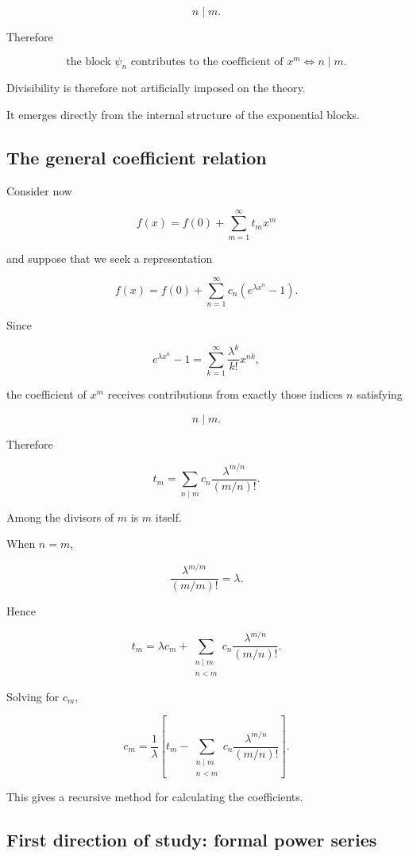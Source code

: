 \[
n\mid m.
\]

Therefore

\[
\boxed{
\text{the block }\psi_n
\text{ contributes to the coefficient of }x^m
\Longleftrightarrow
n\mid m.
}
\]

Divisibility is therefore not artificially imposed on the theory.

It emerges directly from the internal structure of the exponential blocks.

\subsection{The general coefficient relation}

Consider now

\[
f(x)
=
f(0)
+
\sum_{m=1}^{\infty}
t_mx^m
\]

and suppose that we seek a representation

\[
f(x)
=
f(0)
+
\sum_{n=1}^{\infty}
c_n
\left(
e^{\lambda x^n}-1
\right).
\]

Since

\[
e^{\lambda x^n}-1
=
\sum_{k=1}^{\infty}
\frac{\lambda^k}{k!}x^{nk},
\]

the coefficient of \(x^m\) receives contributions from exactly those
indices \(n\) satisfying

\[
n\mid m.
\]

Therefore

\[
\boxed{
t_m
=
\sum_{n\mid m}
c_n
\frac{\lambda^{m/n}}{(m/n)!}.
}
\]

Among the divisors of \(m\) is \(m\) itself.

When \(n=m\),

\[
\frac{\lambda^{m/m}}{(m/m)!}
=
\lambda.
\]

Hence

\[
t_m
=
\lambda c_m
+
\sum_{\substack{n\mid m\\n<m}}
c_n
\frac{\lambda^{m/n}}{(m/n)!}.
\]

Solving for \(c_m\),

\[
\boxed{
c_m
=
\frac{1}{\lambda}
\left[
t_m
-
\sum_{\substack{n\mid m\\n<m}}
c_n
\frac{\lambda^{m/n}}{(m/n)!}
\right].
}
\]

This gives a recursive method for calculating the coefficients.

\subsection{First direction of study: formal power series}

